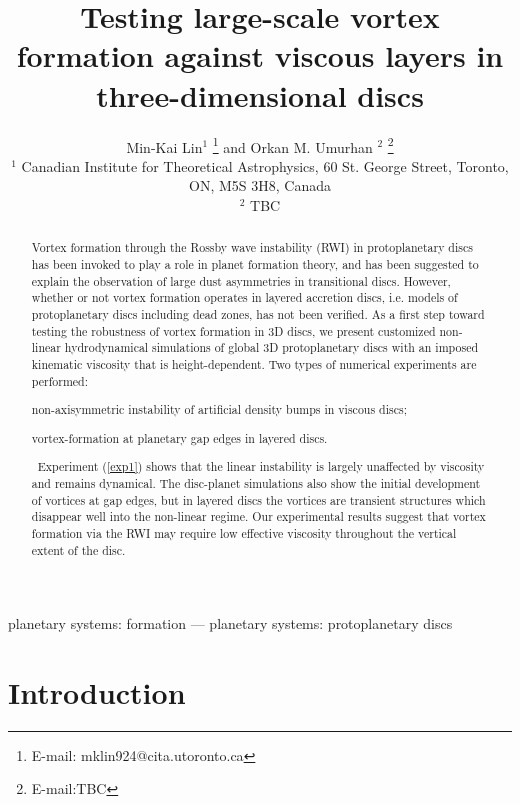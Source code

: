 \documentclass[useAMS,usenatbib]{mn2e}
\title[Vortices in viscous discs]{Testing large-scale 
  vortex formation against viscous layers in three-dimensional discs}
\author[Lin and Umurhan]{ Min-Kai Lin$^1$
  \thanks{E-mail: mklin924@cita.utoronto.ca} and Orkan M. Umurhan $^2$ \thanks{E-mail:TBC} \\
  $^1$ Canadian Institute for Theoretical Astrophysics,
  60 St. George Street, Toronto, ON, M5S 3H8, Canada \\
  $^2$ TBC
}
\begin{document}
\maketitle
\begin{abstract}
  Vortex formation through the Rossby wave 
  instability (RWI) in protoplanetary discs has been invoked to play a
  role in planet formation theory, and has been suggested to explain
  the observation of large dust asymmetries in transitional discs.   
  However, whether or not vortex formation operates in layered
  accretion discs, i.e. models of protoplanetary discs including dead zones, 
  has not been verified. As a first step toward testing the robustness of
  vortex formation in 3D discs, we present customized
  non-linear hydrodynamical 
  simulations of global 3D protoplanetary discs with an imposed kinematic
  viscosity that is height-dependent. Two types of numerical 
  experiments are performed:
  \begin{inparaenum}[(i)]
  \item non-axisymmetric instability of artificial
    density bumps in viscous discs;\label{exp1}  
  \item vortex-formation at planetary gap edges in layered discs.%
  \end{inparaenum}\,
   Experiment (\ref{exp1}) shows that the linear instability is
   largely unaffected by viscosity and remains dynamical.   
   The disc-planet simulations  
   also show the initial development of vortices at gap edges, but in
   layered discs the vortices are transient structures which disappear  
   well into the non-linear regime. Our experimental results suggest that vortex
   formation via the RWI may require low effective viscosity throughout the 
   vertical extent of the disc. 
\end{abstract}

\begin{keywords}
planetary systems: formation --- planetary systems:
protoplanetary discs
\end{keywords}


\section{Introduction}\label{intro}
\end{document}
